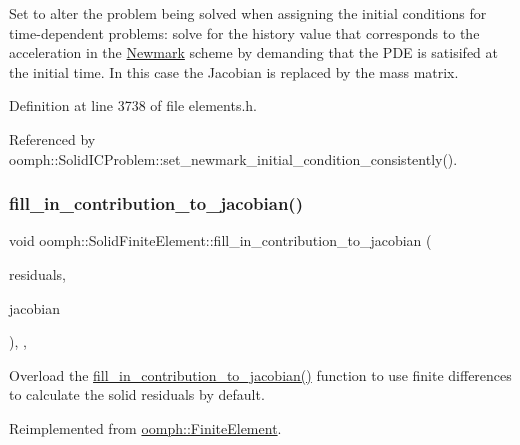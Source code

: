 Set to alter the problem being solved when assigning the initial conditions for time-\/dependent problems\+: solve for the history value that corresponds to the acceleration in the \hyperlink{classoomph_1_1Newmark}{Newmark} scheme by demanding that the P\+DE is satisifed at the initial time. In this case the Jacobian is replaced by the mass matrix. 



Definition at line 3738 of file elements.\+h.



Referenced by oomph\+::\+Solid\+I\+C\+Problem\+::set\+\_\+newmark\+\_\+initial\+\_\+condition\+\_\+consistently().

\mbox{\label{classoomph_1_1SolidFiniteElement_a3167a2005e33815948bef357214e15ee}} 
\subsubsection{\texorpdfstring{fill\+\_\+in\+\_\+contribution\+\_\+to\+\_\+jacobian()}{fill\_in\_contribution\_to\_jacobian()}}
{\footnotesize\ttfamily void oomph\+::\+Solid\+Finite\+Element\+::fill\+\_\+in\+\_\+contribution\+\_\+to\+\_\+jacobian (\begin{DoxyParamCaption}\item[{\hyperlink{classoomph_1_1Vector}{Vector}$<$ double $>$ \&}]{residuals,  }\item[{\hyperlink{classoomph_1_1DenseMatrix}{Dense\+Matrix}$<$ double $>$ \&}]{jacobian }\end{DoxyParamCaption})\hspace{0.3cm}{\ttfamily [inline]}, {\ttfamily [protected]}, {\ttfamily [virtual]}}



Overload the \hyperlink{classoomph_1_1SolidFiniteElement_a3167a2005e33815948bef357214e15ee}{fill\+\_\+in\+\_\+contribution\+\_\+to\+\_\+jacobian()} function to use finite differences to calculate the solid residuals by default. 



Reimplemented from \hyperlink{classoomph_1_1FiniteElement_a0ae7af222af38a0d53bf283dc85bdfea}{oomph\+::\+Finite\+Element}.



